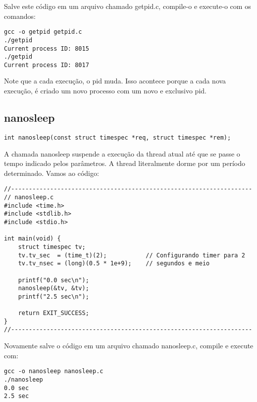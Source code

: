 Salve este código em um arquivo chamado getpid.c, compile-o e execute-o com os comandos:

\begin{espacosimples}
\begin{verbatim}
gcc -o getpid getpid.c
./getpid
Current process ID: 8015
./getpid
Current process ID: 8017
\end{verbatim}
\end{espacosimples}

Note que a cada execução, o pid muda. Isso acontece porque a cada nova execução, é criado um novo processo com um novo e exclusivo pid.

\subsection{nanosleep}

\begin{verbatim}
int nanosleep(const struct timespec *req, struct timespec *rem);
\end{verbatim}

A chamada nanosleep suspende a execução da thread atual até que se passe o tempo indicado pelos parâmetros. A thread literalmente dorme por um período determinado. Vamos ao código:

\newpage

\begin{espacosimples}
\begin{verbatim}
//--------------------------------------------------------------------
// nanosleep.c
#include <time.h>
#include <stdlib.h>
#include <stdio.h>

int main(void) {
    struct timespec tv;
    tv.tv_sec  = (time_t)(2);           // Configurando timer para 2
    tv.tv_nsec = (long)(0.5 * 1e+9);    // segundos e meio
    
    printf("0.0 sec\n");
    nanosleep(&tv, &tv);
    printf("2.5 sec\n");
    
    return EXIT_SUCCESS;
}
//--------------------------------------------------------------------
\end{verbatim}
\end{espacosimples}

Novamente salve o código em um arquivo chamado nanosleep.c, compile e execute com:

\begin{espacosimples}
\begin{verbatim}
gcc -o nanosleep nanosleep.c
./nanosleep
0.0 sec
2.5 sec
\end{verbatim}
\end{espacosimples}

